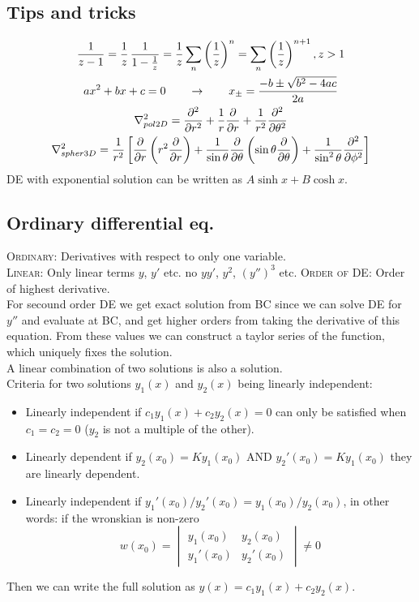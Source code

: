 \documentclass[a4paper, 10pt]{article}
\begin{document}
\begin{multicols*}{3}
\begin{mdframed}
\subsection*{Tips and tricks}
\end{mdframed}
\begin{multline*}
  \frac{1}{z-1} = \frac{1}{z}\,\frac{1}{1-\frac{1}{z}} = \frac{1}{z}\sum_n\left(\frac{1}{z}\right)^n = \sum_n\left(\frac{1}{z}\right)^{n+1}, z>1 \\
  ax^2 + bx + c = 0 \qquad \rightarrow \qquad x_{\pm} = \frac{-b \pm \sqrt{b^2 - 4ac}}{2a} \\
  \nabla^2_{pol2D} = \pdv[2]{}{r} + \frac{1}{r}\pdv{}{r} + \frac{1}{r^2}\pdv[2]{}{\theta}\\
  \nabla^2_{spher3D} = \frac{1}{r^2}\left[ \pdv{}{r}\left( r^2\pdv{}{r} \right) + \frac{1}{\sin{\theta}}\pdv{}{\theta}\left( \sin{\theta}\pdv{}{\theta}\right) + \frac{1}{\sin^2{\theta}}\pdv[2]{}{\phi}\right]
\end{multline*}
DE with exponential solution can be written as $A\sinh{x} + B\cosh{x}$.
\newpage


\begin{mdframed}
\subsection*{Ordinary differential eq.}
\end{mdframed}
\textsc{Ordinary:} Derivatives with respect to only one variable.\\
\textsc{Linear:} Only linear terms $y$, $y'$ etc. no $yy'$, $y^2$, $(y'')^3$ etc.
\textsc{Order of DE:} Order of highest derivative.\\
For secound order DE we get exact solution from BC since we can solve DE for $y''$ and evaluate at BC, and get higher orders from taking the derivative of this equation. From these values we can construct a taylor series of the function, which uniquely fixes the solution.\\
A linear combination of two solutions is also a solution.\\
Criteria for two solutions $y_1(x)$ and $y_2(x)$ being linearly independent:
\begin{itemize}
  \item Linearly independent if $c_1y_1(x) + c_2y_2(x) = 0$ can only be satisfied when $c_1 = c_2=0$ ($y_2$ is not a multiple of the other).
  \item Linearly dependent if $y_2(x_0) = Ky_1(x_0)$ AND $y_2'(x_0) = Ky_1(x_0)$ they are linearly dependent.
  \item Linearly independent if $y_1'(x_0)/y_2'(x_0) = y_1(x_0)/y_2(x_0)$, in other words: if the wronskian is non-zero $$ w(x_0) = \begin{vmatrix}
  y_1(x_0)  & y_2(x_0)\\
  y_1'(x_0) & y_2'(x_0)
  \end{vmatrix} \neq 0$$
\end{itemize}
Then we can write the full solution as $y(x)=c_1y_1(x) + c_2y_2(x)$.

\end{multicols*}
\end{document}
